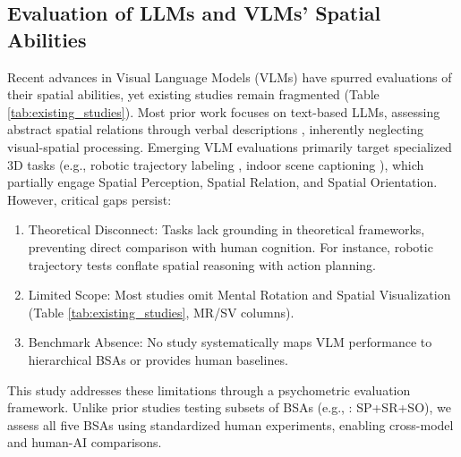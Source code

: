 

\subsection{Evaluation of LLMs and VLMs' Spatial Abilities}

Recent advances in Visual Language Models (VLMs) have spurred evaluations of their spatial abilities, yet existing studies remain fragmented (Table \ref{tab:existing_studies}). Most prior work focuses on text-based LLMs, assessing abstract spatial relations through verbal descriptions \cite{yamadaEvaluatingSpatialUnderstanding2024}, inherently neglecting visual-spatial processing. Emerging VLM evaluations primarily target specialized 3D tasks (e.g., robotic trajectory labeling \cite{sharmaExploringImprovingSpatial2023}, indoor scene captioning \cite{fuSceneLLMExtendingLanguage2024}), which partially engage Spatial Perception, Spatial Relation, and Spatial Orientation. However, critical gaps persist: 

\begin{enumerate}

\item Theoretical Disconnect: Tasks lack grounding in theoretical frameworks, preventing direct comparison with human cognition. For instance, robotic trajectory tests \cite{sharmaExploringImprovingSpatial2023} conflate spatial reasoning with action planning.
\item Limited Scope: Most studies omit Mental Rotation and Spatial Visualization (Table \ref{tab:existing_studies}, MR/SV columns).
\item Benchmark Absence: No study systematically maps VLM performance to hierarchical BSAs or provides human baselines.

\end{enumerate}

This study addresses these limitations through a psychometric evaluation framework. Unlike prior studies testing subsets of BSAs (e.g., \citet{fuSceneLLMExtendingLanguage2024}: SP+SR+SO), we assess all five BSAs using standardized human experiments, enabling cross-model and human-AI comparisons.


